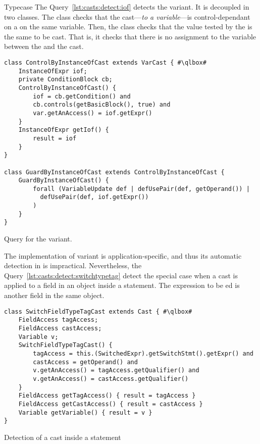 \begin{pattern}{Typecase}
The Query~\ref{lst:casts:detect:iof} detects the  variant.
It is decoupled in two \ql{} classes.
The  class checks that the cast---\emph{to a variable}---is control-dependant on a  on the same variable.
Then, the  class checks that the value tested by the  is the same to be cast.
That is, it checks that there is no assignment to the variable between the  and the cast.

\begin{listing}
\begin{verbatim}
class ControlByInstanceOfCast extends VarCast { #\qlbox#
	InstanceOfExpr iof;
	private ConditionBlock cb;
	ControlByInstanceOfCast() {
		iof = cb.getCondition() and
		cb.controls(getBasicBlock(), true) and
		var.getAnAccess() = iof.getExpr()
	}
	InstanceOfExpr getIof() {
		result = iof
	}
}

class GuardByInstanceOfCast extends ControlByInstanceOfCast {
	GuardByInstanceOfCast() {
		forall (VariableUpdate def | defUsePair(def, getOperand()) |
		  defUsePair(def, iof.getExpr())
		)
	}
}
\end{verbatim}
\caption{Query for the  variant.}
\label{lst:casts:detect:iof}
\end{listing}

The implementation of  variant is application-specific,
and thus its automatic detection in \ql{} is impractical.
Nevertheless, the Query~\ref{lst:casts:detect:switchtypetag} detect the special case when a cast is applied to a field in an object inside a  statement.
The expression to be ed is another field in the same object.

\begin{listing}
\begin{verbatim}
class SwitchFieldTypeTagCast extends Cast { #\qlbox#
	FieldAccess tagAccess;
	FieldAccess castAccess;
	Variable v;
	SwitchFieldTypeTagCast() {
		tagAccess = this.(SwitchedExpr).getSwitchStmt().getExpr() and
		castAccess = getOperand() and
		v.getAnAccess() = tagAccess.getQualifier() and
		v.getAnAccess() = castAccess.getQualifier()
	}
	FieldAccess getTagAccess() { result = tagAccess }
	FieldAccess getCastAccess() { result = castAccess }
	Variable getVariable() { result = v }
}
\end{verbatim}
\caption{Detection of a cast inside a  statement}
\label{lst:casts:detect:switchtypetag}
\end{listing}


\end{pattern}
